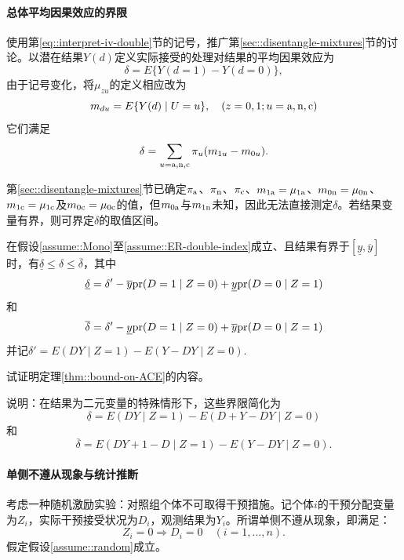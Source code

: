  
\paragraph{总体平均因果效应的界限}\label{para::bounds-ACE}


使用第\ref{eq::interpret-iv-double}节的记号，推广第\ref{sec::disentangle-mixtures}节的讨论。以潜在结果$Y(d)$定义实际接受的处理对结果的平均因果效应为$$
\delta = E\{  Y(d=1) - Y(d=0) \},
$$由于记号变化，将$\mu_{zu} $的定义相应改为$$
m_{du} = E\{  Y(d) \mid U = u\},\quad  (z=0,1;u=\textup{a}, \textup{n}, \textup{c}) 
$$它们满足$$
\delta = \sum_{u = \textup{a}, \textup{n}, \textup{c}}  \pi_u  (m_{1u} - m_{0u}).
$$

第\ref{sec::disentangle-mixtures}节已确定$\pi_{\textup{a}}$、$\pi_{\textup{n}}$、$\pi_{\textup{c}}$、$m_{1\textup{a}} = \mu_{1 \textup{a}}$、$m_{0\textup{n}} = \mu_{0\textup{n} }$、$m_{1\textup{c}} = \mu_{1\textup{c}}$及$m_{0\textup{c}} = \mu_{0\textup{c}}$的值，但$m_{0 \textup{a}}$与$m_{1\textup{n} }$未知，因此无法直接测定$\delta$。若结果变量有界，则可界定$\delta$的取值区间。  

\begin{theorem}
\label{thm::bound-on-ACE}
在假设\ref{assume::Mono}至\ref{assume::ER-double-index}成立、且结果有界于$[\underline{y}, \overline{y}]$时，有$\underline{\delta} \leq  \delta  \leq \overline{\delta}$，其中$$
\underline{\delta} =  \delta'  - \overline{y} \textup{pr}(D=1\mid Z=0) + \underline{y} \textup{pr}(D=0\mid Z=1)
$$和$$
\overline{\delta} = \delta'  -   \underline{y} \textup{pr}(D=1\mid Z=0) +  \overline{y}  \textup{pr}(D=0\mid Z=1) 
$$并记$\delta' = E(DY\mid Z=1) - E(Y-DY\mid Z=0) .$
\end{theorem}

试证明定理\ref{thm::bound-on-ACE}的内容。 
 
 
说明：在结果为二元变量的特殊情形下，这些界限简化为$$
\underline{\delta} =   E(DY\mid Z=1) - E( D+Y-DY\mid Z=0)  
$$和$$
\overline{\delta} =  E(DY+1-D\mid Z=1) - E(Y-DY\mid Z=0) .
 $$
 
 
 \paragraph{单侧不遵从现象与统计推断}\label{para::15-onesidednoncompliance}
 
考虑一种随机激励实验：对照组个体不可取得干预措施。记个体$i$的干预分配变量为$Z_i$，实际干预接受状况为$D_i$，观测结果为$Y_i$。所谓单侧不遵从现象，即满足：
$$
Z_i=0 \Longrightarrow  D_i = 0 \quad (i=1,\ldots, n). 
$$
假定假设\ref{assume::random}成立。 
 
